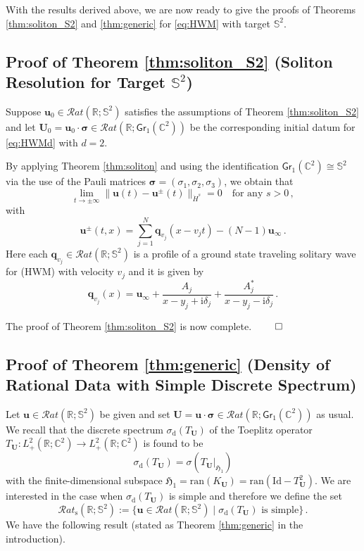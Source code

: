 \documentclass[11pt,reqno]{amsart}
\theoremstyle{definition}
\theoremstyle{remark}
\theoremstyle{remark}
\numberwithin{equation}{section}
\newcommand{\Hfr}{\mathfrak{H}}
\newcommand{\C}{\mathbb{C}}
\newcommand{\R}{\mathbb{R}}
\newcommand{\Ss}{\mathbb{S}}
\newcommand{\ran}{\mathrm{ran}}
\newcommand{\qv}{\mathbf{q}}
\newcommand{\ii}{\mathrm{i}}
\newcommand{\uu}{\mathbf{u}}
\newcommand{\Ub}{\mathbf{U}}
\newcommand{\id}{\mathrm{Id}}
\newcommand{\Gr}{\mathsf{Gr}}
\begin{document}
With the results derived above, we are now ready to give the proofs of Theorems \ref{thm:soliton_S2} and \ref{thm:generic} for \eqref{eq:HWM} with target $\Ss^2$.

\subsection*{Proof of Theorem \ref{thm:soliton_S2} (Soliton Resolution for Target $\Ss^2$)}
Suppose $\uu_0 \in \mathcal{R}at(\R;\Ss^2)$ satisfies the assumptions of Theorem \ref{thm:soliton_S2} and let $\Ub_0 = \uu_0 \cdot \bm{\sigma} \in \mathcal{R}at(\R; \Gr_1(\C^2))$ be the corresponding initial datum for \eqref{eq:HWMd} with $d=2$. 

By applying Theorem \ref{thm:soliton} and using the identification $\Gr_1(\C^2) \cong \Ss^2$ via the use of the Pauli matrices $\bm{\sigma}=(\sigma_1, \sigma_2, \sigma_3)$, we obtain that
$$
\lim_{t \to \pm \infty} \| \uu(t) - \uu^{\pm}(t) \|_{\dot{H}^s} = 0 \quad \mbox{for any $s > 0$} \, ,
$$
with
$$
\uu^{\pm}(t,x) = \sum_{j=1}^N \qv_{v_j}(x-v_jt) - (N-1) \uu_\infty \, .
$$
Here each $\qv_{v_j} \in \mathcal{R}at(\R; \Ss^2)$ is a profile of a ground state traveling solitary wave for (HWM) with velocity $v_j$ and it is given by
$$
\qv_{v_j}(x) = \uu_\infty + \frac{A_j}{x-y_j+ \ii \delta_j} + \frac{A_j^*}{x-y_j - \ii \delta_j} \, .
$$


The proof of Theorem \ref{thm:soliton_S2} is now complete. \hfill $\qed$ 

\subsection*{Proof of Theorem \ref{thm:generic} (Density of Rational Data with Simple Discrete Spectrum)}
Let $\uu \in \mathcal{R}at(\R; \Ss^2)$ be given and set $\Ub = \uu \cdot \bm{\sigma} \in \mathcal{R}at(\R; \Gr_1(\C^2))$ as usual. We recall that the discrete spectrum $\sigma_{\mathrm{d}}(T_\Ub)$ of  the Toeplitz operator $T_{\Ub} : L^2_+(\R; \C^2) \to L^2_+(\R; \C^2)$ is found to be
$$
\sigma_{\mathrm{d}}(T_{\Ub}) = \sigma(T_{\Ub} |_{\Hfr_1}) 
$$
with the finite-dimensional subspace $\Hfr_1 = \ran(K_{\Ub})=\ran(\id-T_{\Ub}^2)$. We are interested in the case when $\sigma_{\mathrm{d}}(T_\Ub)$ is simple and therefore we define the set
$$
\mathcal{R}at_{\mathrm{s}}(\R; \Ss^2) := \{ \uu \in \mathcal{R}at(\R; \Ss^2) \mid \mbox{$\sigma_{\mathrm{d}}(T_\Ub)$ is simple} \} \, .
$$
We have the following result (stated as Theorem \ref{thm:generic} in the introduction).
\end{document}
